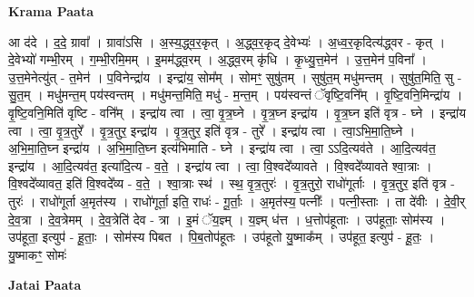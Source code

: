 \documentclass[17pt]{extarticle}
\begin{document}
\textbf{Krama Paata} \newline

आ द॑दे । द॒दे॒ ग्रावा᳚ । ग्रावा॑ऽसि । अ॒स्य॒द्ध्व॒र॒कृत् । अ॒द्ध्व॒र॒कृद् दे॒वेभ्यः॑ । अ॒ध्व॒र॒कृदित्य॑द्ध्वर - कृत् । दे॒वेभ्यो॑ गम्भी॒रम् । ग॒म्भी॒रमि॒मम् । इ॒मम॑द्ध्व॒रम् । अ॒द्ध्व॒रम् कृ॑धि । कृ॒ध्यु॒त्त॒मेन॑ । उ॒त्त॒मेन॑ प॒विना᳚ । उ॒त्त॒मेनेत्यु॑त् - त॒मेन॑ । प॒विनेन्द्रा॑य । इन्द्रा॑य॒ सोम᳚म् । सोमꣳ॒॒ सुषु॑तम् । सुषु॑त॒म् मधु॑मन्तम् । सुषु॑त॒मिति॒ सु - सु॒त॒म् । मधु॑मन्त॒म् पय॑स्वन्तम् । मधु॑मन्त॒मिति॒ मधु॑ - म॒न्त॒म् । पय॑स्वन्तं ॅवृष्टि॒वनि᳚म् । वृ॒ष्टि॒वनि॒मिन्द्रा॑य । वृ॒ष्टि॒वनि॒मिति॑ वृष्टि - वनि᳚म् । इन्द्रा॑य त्वा । त्वा॒ वृ॒त्र॒घ्ने । वृ॒त्र॒घ्न इन्द्रा॑य । वृ॒त्र॒घ्न इति॑ वृत्र - घ्ने । इन्द्रा॑य त्वा । त्वा॒ वृ॒त्र॒तुरे᳚ । वृ॒त्र॒तुर॒ इन्द्रा॑य । वृ॒त्र॒तुर॒ इति॑ वृत्र - तुरे᳚ । इन्द्रा॑य त्वा । त्वा॒ऽभि॒मा॒ति॒घ्ने । अ॒भि॒मा॒ति॒घ्न इन्द्रा॑य । अ॒भि॒मा॒ति॒घ्न इत्य॑भिमाति - घ्ने । इन्द्रा॑य त्वा । त्वा॒ ऽऽदि॒त्यव॑ते । आ॒दि॒त्यव॑त॒ इन्द्रा॑य । आ॒दि॒त्यव॑त॒ इत्या॑दि॒त्य - व॒ते॒ । इन्द्रा॑य त्वा । त्वा॒ वि॒श्वदे᳚व्यावते । वि॒श्वदे᳚व्यावते श्वा॒त्राः । वि॒श्वदे᳚व्यावत॒ इति॑ वि॒श्वदे᳚व्य - व॒ते॒ । श्वा॒त्राः स्थ॑ । स्थ॒ वृ॒त्र॒तुरः॑ । वृ॒त्र॒तुरो॒ राधो॑गूर्ताः । वृ॒त्र॒तुर॒ इति॑ वृत्र - तुरः॑ । राधो॑गूर्ता अ॒मृत॑स्य । राधो॑गूर्ता॒ इति॒ राधः॑ - गू॒र्ताः॒ । अ॒मृत॑स्य॒ पत्नीः᳚ । पत्नी॒स्ताः । ता दे॑वीः । दे॒वी॒र् दे॒व॒त्रा । दे॒व॒त्रेमम् । दे॒व॒त्रेति॑ देव - त्रा । इ॒मं ॅय॒ज्ञ्म् । य॒ज्ञ्म् ध॑त्त । ध॒त्तोप॑हूताः । उप॑हूताः॒ सोम॑स्य । उप॑हूता॒ इत्युप॑ - हू॒ताः॒ । सोम॑स्य पिबत । पि॒ब॒तोप॑हूतः । उप॑हूतो यु॒ष्माक᳚म् । उप॑हूत॒ इत्युप॑ - हू॒तः॒ । यु॒ष्माकꣳ॒॒ सोमः॑ \newline

\textbf{Jatai Paata} \newline
\end{document}
